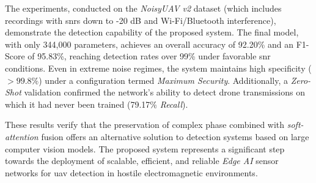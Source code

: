 The experiments, conducted on the \textit{NoisyUAV v2} dataset (which includes recordings with \glspl{snr} down to -20 dB and Wi-Fi/Bluetooth interference), demonstrate the detection capability of the proposed system. The final model, with only 344,000 parameters, achieves an overall accuracy of 92.20\% and an F1-Score of 95.83\%, reaching detection rates over 99\% under favorable \gls{snr} conditions. Even in extreme noise regimes, the system maintains high specificity ($>99.8\%$) under a configuration termed \textit{Maximum Security}. Additionally, a \textit{Zero-Shot} validation confirmed the network's ability to detect drone transmissions on which it had never been trained (79.17\% \textit{Recall}). 

These results verify that the preservation of complex phase combined with \textit{soft-attention} fusion offers an alternative solution to detection systems based on large computer vision models. The proposed system represents a significant step towards the deployment of scalable, efficient, and reliable \textit{Edge AI} sensor networks for \gls{uav} detection in hostile electromagnetic environments.
